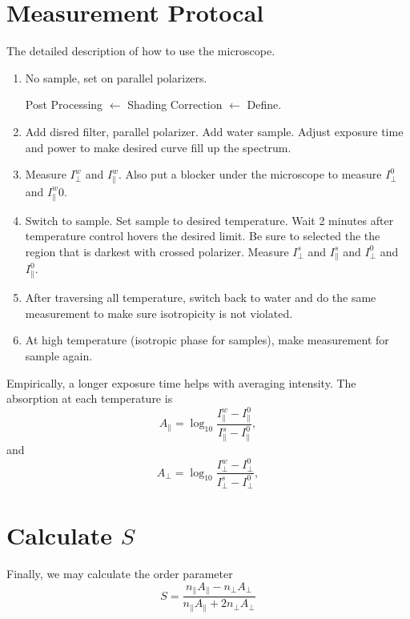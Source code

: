 \documentclass[11pt]{article}
\begin{document}
\section*{Measurement Protocal}
The detailed description of how to use the microscope. 
\begin{enumerate}
    \item No sample, set on parallel polarizers. 
    
    Post Processing $\leftarrow$ Shading Correction $\leftarrow$ Define. 


    \item Add disred filter, parallel polarizer. Add water sample. Adjust exposure time and power to make desired curve fill up the spectrum. 
    
    \item Measure $I_\perp^w$ and $I_\parallel^w$. Also put a blocker under the microscope to measure $I_\perp^0$ and $I_\parallel^w0.$
    \item Switch to sample. Set sample to desired temperature. Wait 2 minutes after temperature control hovers the desired limit. Be sure to selected the 
the region that is darkest with crossed polarizer. Measure $I_\perp^s$ and $I_\parallel^s$ and $I_\perp^0$ and $I_\parallel^0$. 
    \item After traversing all temperature, switch back to water and do the same measurement to make sure isotropicity is not violated. 
    \item At high temperature (isotropic phase for samples), make measurement for sample again. 
\end{enumerate}
Empirically, a longer exposure time helps with averaging intensity. 
The absorption at each temperature is 
\begin{equation}
    A_\parallel = \log_{10} \frac{I_\parallel^w-I_\parallel^0}{I_\parallel^s-I_\parallel^0},
\end{equation}
and 
\begin{equation}
    A_\perp = \log_{10} \frac{I_\perp^w-I_\perp^0}{I_\perp^s-I_\perp^0},
\end{equation}
\section*{Calculate $S$}
Finally, we may calculate the order parameter
\begin{equation}
    \boxed{S = \frac{n_{\parallel}A_{\parallel}-n_{\perp}A_{\perp}}{n_{\parallel}A_{\parallel}+2n_{\perp}A_{\perp}}}
\end{equation}
\end{document}

